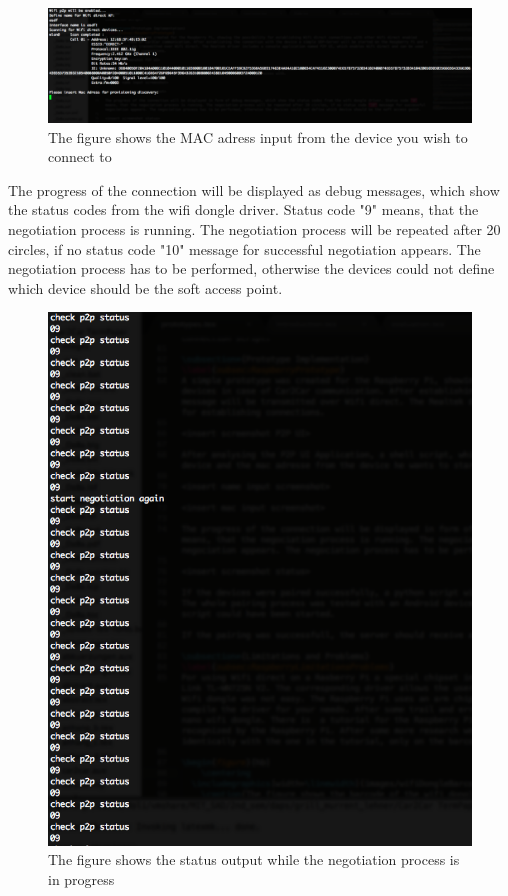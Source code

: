 \begin{figure}[!hb]
	\centering
  \includegraphics[width=\linewidth]{images/enterMac_screenshot.eps}
	\caption{The figure shows the MAC adress input from the device you wish to connect to}
	\label{fig1}
\end{figure}

\noindent The progress of the connection will be displayed as debug messages, which show the status codes from the wifi dongle driver. Status code "9" means, that the negotiation process is running. The negotiation process will be repeated after 20 circles, if no status code "10" message for successful negotiation appears. The negotiation process has to be performed, otherwise the devices could not define which device should be the soft access point\cite{realtekprogrammingguide}.

\begin{figure}[!hb]
	\centering
  \includegraphics[width=\linewidth]{images/status_screenshot.eps}
	\caption{The figure shows the status output while the negotiation process is in progress}
	\label{fig1}
\end{figure}

